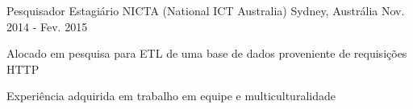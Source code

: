 \begin{cventries}
%
%

  \cventry
    {Pesquisador Estagiário} %
    {NICTA (National ICT Australia)} %
    {Sydney, Austrália} %
    {Nov. 2014 - Fev. 2015} %
    {
      \begin{cvitems} %
        \item {Alocado em pesquisa para ETL de uma base de dados proveniente de requisições HTTP}
        \item {Experiência adquirida em trabalho em equipe e multiculturalidade}
      \end{cvitems}
    }


\end{cventries}

